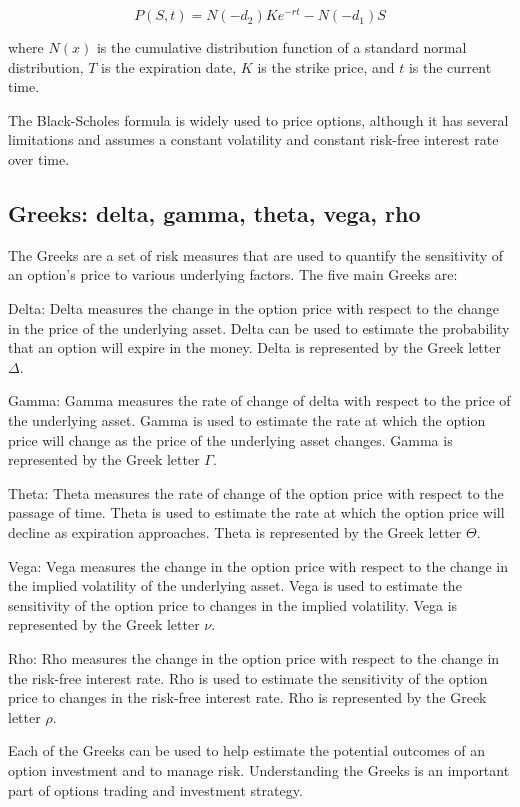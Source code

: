 \documentclass[12pt, a4paper, oneside]{article}
\begin{document}
$$P(S,t) = N(-d_2)Ke^{-rt} - N(-d_1)S$$

where $N(x)$ is the cumulative distribution function of a standard normal distribution, $T$ is the expiration date, $K$ is the strike price, and $t$ is the current time.

The Black-Scholes formula is widely used to price options, although it has several limitations and assumes a constant volatility and constant risk-free interest rate over time.

\subsection{ Greeks: delta, gamma, theta, vega, rho }
The Greeks are a set of risk measures that are used to quantify the sensitivity of an option's price to various underlying factors. The five main Greeks are:

Delta: Delta measures the change in the option price with respect to the change in the price of the underlying asset. Delta can be used to estimate the probability that an option will expire in the money. Delta is represented by the Greek letter $\Delta$.

Gamma: Gamma measures the rate of change of delta with respect to the price of the underlying asset. Gamma is used to estimate the rate at which the option price will change as the price of the underlying asset changes. Gamma is represented by the Greek letter $\Gamma$.

Theta: Theta measures the rate of change of the option price with respect to the passage of time. Theta is used to estimate the rate at which the option price will decline as expiration approaches. Theta is represented by the Greek letter $\Theta$.

Vega: Vega measures the change in the option price with respect to the change in the implied volatility of the underlying asset. Vega is used to estimate the sensitivity of the option price to changes in the implied volatility. Vega is represented by the Greek letter $\nu$.

Rho: Rho measures the change in the option price with respect to the change in the risk-free interest rate. Rho is used to estimate the sensitivity of the option price to changes in the risk-free interest rate. Rho is represented by the Greek letter $\rho$.

Each of the Greeks can be used to help estimate the potential outcomes of an option investment and to manage risk. Understanding the Greeks is an important part of options trading and investment strategy.
\end{document}
